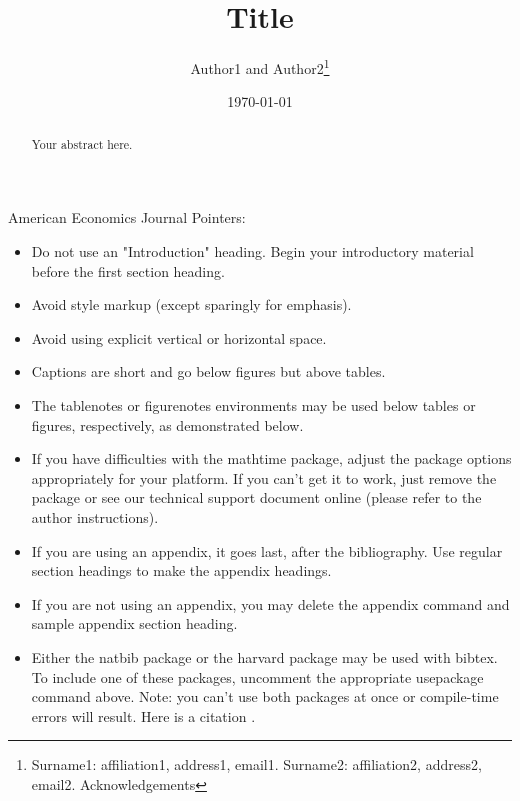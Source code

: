 \documentclass[AEJ,
finalmode,  %
]{AEA}
\begin{document}
\title{Title}
\author{Author1 and Author2\thanks{%
        Surname1: affiliation1, address1, email1. Surname2: affiliation2, address2,
        email2. Acknowledgements}}
\date{\today}
\JEL{}
\Keywords{}

\begin{abstract}
    Your abstract here.
\end{abstract}

\maketitle

American Economics Journal Pointers:

\begin{itemize}
    \item Do not use an "Introduction" heading. Begin your introductory material before the first section heading.
          
    \item Avoid style markup (except sparingly for emphasis).
          
    \item Avoid using explicit vertical or horizontal space.
          
    \item Captions are short and go below figures but above tables.
          
    \item The tablenotes or figurenotes environments may be used below tables or figures, respectively, as demonstrated below.
          
    \item If you have difficulties with the mathtime package, adjust the package options appropriately for your platform. If you can't get it to work, just remove the package or see our technical support document online (please refer to the author instructions).
          
    \item If you are using an appendix, it goes last, after the bibliography. Use regular section headings to make the appendix headings.
          
    \item If you are not using an appendix, you may delete the appendix command  and sample appendix section heading.
          
    \item Either the natbib package or the harvard package may be used with bibtex.
          To include one of these packages, uncomment the appropriate usepackage command
          above. Note: you can't use both packages at once or compile-time errors will result. Here is a citation \cite{Lehe2024}.
          
\end{itemize}
\end{document}
